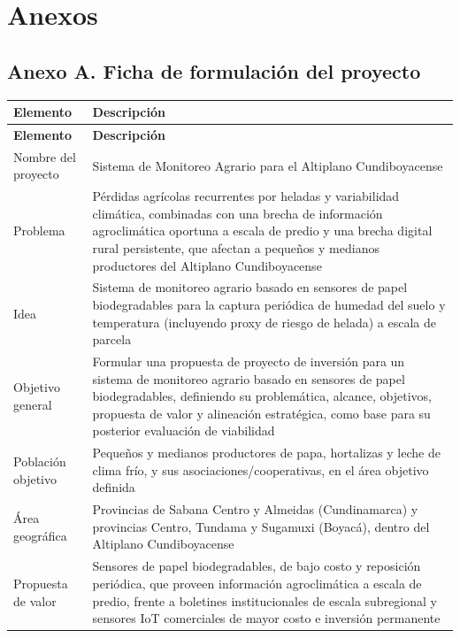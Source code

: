 \documentclass[11pt,a4paper]{article}
\begin{document}
\section{Anexos}

\subsection*{Anexo A. Ficha de formulación del proyecto}

\begin{longtable}{L{3.6cm}L{10.4cm}}
\toprule
\textbf{Elemento} & \textbf{Descripción}\\
\midrule
\endfirsthead
\toprule
\textbf{Elemento} & \textbf{Descripción}\\
\midrule
\endhead
Nombre del proyecto & Sistema de Monitoreo Agrario para el Altiplano Cundiboyacense\\
Problema & Pérdidas agrícolas recurrentes por heladas y variabilidad climática, combinadas con una brecha de información agroclimática oportuna a escala de predio y una brecha digital rural persistente, que afectan a pequeños y medianos productores del Altiplano Cundiboyacense\\
Idea & Sistema de monitoreo agrario basado en sensores de papel biodegradables para la captura periódica de humedad del suelo y temperatura (incluyendo proxy de riesgo de helada) a escala de parcela\\
Objetivo general & Formular una propuesta de proyecto de inversión para un sistema de monitoreo agrario basado en sensores de papel biodegradables, definiendo su problemática, alcance, objetivos, propuesta de valor y alineación estratégica, como base para su posterior evaluación de viabilidad\\
Población objetivo & Pequeños y medianos productores de papa, hortalizas y leche de clima frío, y sus asociaciones/cooperativas, en el área objetivo definida\\
Área geográfica & Provincias de Sabana Centro y Almeidas (Cundinamarca) y provincias Centro, Tundama y Sugamuxi (Boyacá), dentro del Altiplano Cundiboyacense\\
Propuesta de valor & Sensores de papel biodegradables, de bajo costo y reposición periódica, que proveen información agroclimática a escala de predio, frente a boletines institucionales de escala subregional y sensores IoT comerciales de mayor costo e inversión permanente\\

\end{longtable}
\end{document}
